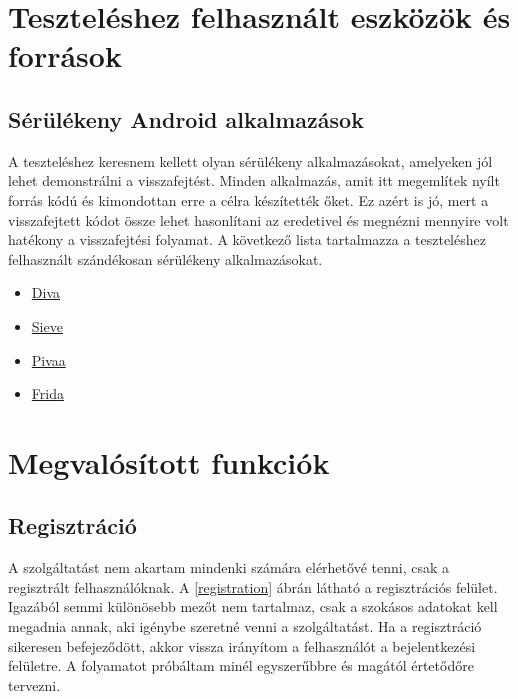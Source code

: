 \documentclass{thesis-ekf}
\theoremstyle{definition}
\theoremstyle{remark}
\begin{document}

\chapter{Teszteléshez felhasznált eszközök és források}\label{teszteles}

\section{Sérülékeny Android alkalmazások}

A teszteléshez keresnem kellett olyan sérülékeny alkalmazásokat, amelyeken jól lehet demonstrálni a visszafejtést.
Minden alkalmazás, amit itt megemlítek nyílt forrás kódú és kimondottan erre a célra készítették őket.
Ez azért is jó, mert a visszafejtett kódot össze lehet hasonlítani az eredetivel és megnézni mennyire volt hatékony a visszafejtési folyamat.
A következő lista tartalmazza a teszteléshez felhasznált szándékosan sérülékeny alkalmazásokat.

\begin{itemize}
	\item \href{https://github.com/payatu/diva-android}{Diva}
	\item \href{https://github.com/as0ler/Android-Examples}{Sieve}
	\item \href{https://github.com/htbridge/pivaa}{Pivaa}
	\item \href{https://github.com/t0thkr1s/frida-demo}{Frida}
\end{itemize}

\chapter{Megvalósított funkciók}\label{funkciok}

\section{Regisztráció}

A szolgáltatást nem akartam mindenki számára elérhetővé tenni, csak a regisztrált felhasználóknak.
A \ref{registration} ábrán látható a regisztrációs felület.
Igazából semmi különösebb mezőt nem tartalmaz, csak a szokásos adatokat kell megadnia annak, aki igénybe szeretné venni a szolgáltatást.
Ha a regisztráció sikeresen befejeződött, akkor vissza irányítom a felhasználót a bejelentkezési felületre.
A folyamatot próbáltam minél egyszerűbbre és magától értetődőre tervezni.
\end{document}

